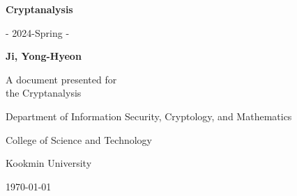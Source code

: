 \begin{titlepage}
    \centering
    
    \vspace*{1cm}
    
    \Huge\textsf{\textbf{Cryptanalysis}}
    
    \vspace{0.5cm}
    \LARGE\textsf{- 2024-Spring -}
    
    \vspace{1.5cm}
    \textbf{Ji, Yong-Hyeon}
    
    \vfill
    
    A document presented for\\
    the Cryptanalysis
    
    \vspace{0.8cm}
    {\large\textsf{Department of Information Security, Cryptology, and Mathematics}\par}
    {\large\textsf{College of Science and Technology}\par}
    {\large\textsf{Kookmin University}\par}
    \vspace{.25in}
    {\large \textsf{\today}\par}
    
\end{titlepage}

